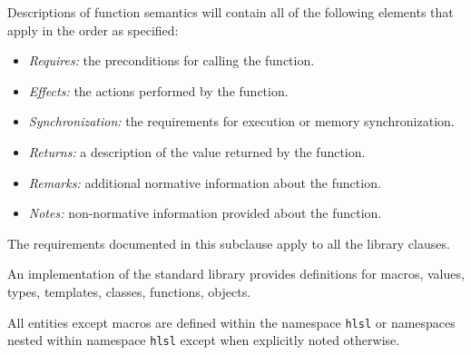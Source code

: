 \p Descriptions of function semantics will contain all of the following elements
that apply in the order as specified:

\begin{itemize}
  \item \textit{Requires:} the preconditions for calling the function.
  \item \textit{Effects:} the actions performed by the function.
  \item \textit{Synchronization:} the requirements for execution or memory
  synchronization.
  \item \textit{Returns:} a description of the value returned by the function.
  \item \textit{Remarks:} additional normative information about the function.
  \item \textit{Notes:} non-normative information provided about the function.
\end{itemize}


\p The requirements documented in this subclause apply to all the library clauses.

\p An implementation of the standard library provides definitions for macros,
values, types, templates, classes, functions, objects.

\p All entities except macros are defined within the namespace \texttt{hlsl} or
namespaces nested within namespace \texttt{hlsl} except when explicitly noted
otherwise.
